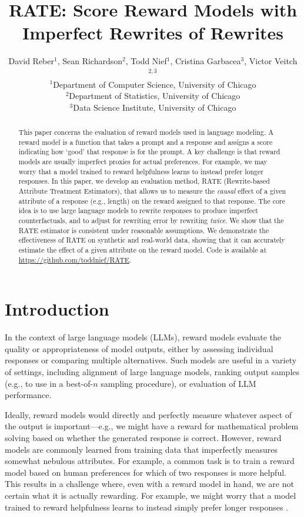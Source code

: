 \documentclass{article}
\title{RATE: Score Reward Models with Imperfect Rewrites of Rewrites}
\author{David Reber$^{1}$, Sean Richardson$^{2}$, Todd Nief$^{1}$, Cristina Garbacea$^{3}$, Victor Veitch$^{2,3}$ \\
$^1$Department of Computer Science, University of Chicago \\
$^2$Department of Statistics, University of Chicago \\
$^3$Data Science Institute, University of Chicago \\
}
\begin{document}
\maketitle

\begin{abstract}
This paper concerns the evaluation of reward models used in language modeling. A reward model is a function that takes a prompt and a response and assigns a score indicating how `good' that response is for the prompt. A key challenge is that reward models are usually imperfect proxies for actual preferences. For example, we may worry that a model trained to reward helpfulness learns to instead prefer longer responses. 
In this paper, we develop an evaluation method, RATE (Rewrite-based Attribute Treatment Estimators), that allows us to measure the \emph{causal} effect of a given attribute of a response (e.g., length) on the reward assigned to that response. 
The core idea is to use large language models to rewrite responses to produce imperfect counterfactuals, and to adjust for rewriting error by rewriting \emph{twice}. We show that the RATE estimator is consistent under reasonable assumptions. We demonstrate the effectiveness of RATE on synthetic and real-world data, showing that it can accurately estimate the effect of a given attribute on the reward model.
Code is available at \url{https://github.com/toddnief/RATE}.
\end{abstract}
  
\section{Introduction}
\label{sec:introduction}
In the context of large language models (LLMs), reward models evaluate the quality or appropriateness of model outputs, either by assessing individual responses or comparing multiple alternatives. Such models are useful in a variety of settings, including alignment of large language models, ranking output samples (e.g., to use in a best-of-$n$ sampling procedure), or evaluation of LLM performance.

Ideally, reward models would directly and perfectly measure whatever aspect of the output is important---e.g., we might have a reward for mathematical problem solving based on whether the generated response is correct. 
However, reward models are commonly learned from training data that imperfectly measures somewhat nebulous attributes. For example, a common task is to train a reward model based on human preferences for which of two responses is more helpful.
This results in a challenge where, even with a reward model in hand, we are not certain what it is actually rewarding.
For example, we might worry that a model trained to reward helpfulness learns to instead simply prefer longer responses \citep{shen2023looselipssinkships, park2024disentanglinglengthqualitydirect,singhal2024longwaygoinvestigating}.
\end{document}
